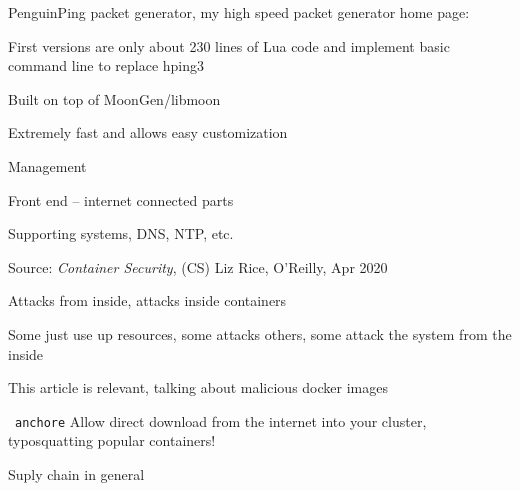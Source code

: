 \documentclass[Screen16to9,17pt]{foils}
\begin{document}
\begin{list2}
\item PenguinPing packet generator, my high speed packet generator
home page: 
\item First versions are only about 230 lines of Lua code and implement basic command line to replace hping3
\item Built on top of MoonGen/libmoon 
\end{list2}

\centerline{Extremely fast and allows easy customization}



\begin{list2}
\item
\end{list2}
Management

Front end -- internet connected parts

Supporting systems, DNS, NTP, etc.





Source: \emph{Container Security}, (CS) Liz Rice, O'Reilly, Apr 2020

\begin{list2}
\item Attacks from inside, attacks inside containers
\item Some just use up resources, some attacks others, some attack the system from the inside
\end{list2}


This article is relevant, talking about malicious docker images\\


\begin{list2}
\item \faWrench\ \verb+anchore+
Allow direct download from the internet into your cluster, typosquatting popular containers!

\item Suply chain in general
\end{list2}
\end{document}

